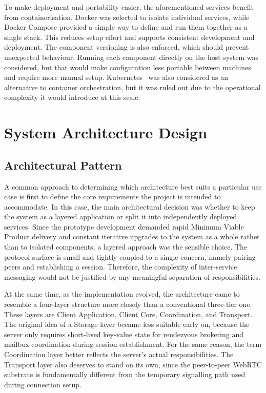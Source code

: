 \documentclass[12pt,a4paper,oneside]{report}
\begin{document}
To make deployment and portability easier, the aforementioned services benefit from containerisation. Docker was selected to isolate individual services, while Docker Compose provided a simple way to define and run them together as a single stack. This reduces setup effort and supports consistent development and deployment. The component versioning is also enforced, which should prevent unexpected behaviour. Running each component directly on the host system was considered, but that would make configuration less portable between machines and require more manual setup. Kubernetes~\cite{kubernetes} was also considered as an alternative to container orchestration, but it was ruled out due to the operational complexity it would introduce at this scale.


\section{System Architecture Design}
\label{sec:system-architecture}

\subsection{Architectural Pattern}
\label{sec:arch-pattern}

A common approach to determining which architecture best suits a particular use case is first to define the core requirements the project is intended to accommodate. In this case, the main architectural decision was whether to keep the system as a layered application or split it into independently deployed services. Since the prototype development demanded rapid Minimum Viable Product delivery and constant iterative upgrades to the system as a whole rather than to isolated components, a layered approach was the sensible choice. The protocol surface is small and tightly coupled to a single concern, namely pairing peers and establishing a session. Therefore, the complexity of inter-service messaging would not be justified by any meaningful separation of responsibilities.

At the same time, as the implementation evolved, the architecture came to resemble a four-layer structure more closely than a conventional three-tier one. These layers are Client Application, Client Core, Coordination, and Transport. The original idea of a Storage layer became less suitable early on, because the server only requires short-lived key-value state for rendezvous brokering and mailbox coordination during session establishment. For the same reason, the term Coordination layer better reflects the server's actual responsibilities. The Transport layer also deserves to stand on its own, since the peer-to-peer WebRTC substrate is fundamentally different from the temporary signalling path used during connection setup.
\end{document}
